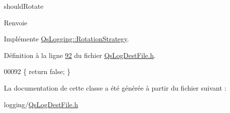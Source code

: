 should\-Rotate 

\begin{DoxyReturn}{Renvoie}

\end{DoxyReturn}


Implémente \hyperlink{classQsLogging_1_1RotationStrategy_a53136a1009e8a0b30956ea83c43c4973}{Qs\-Logging\-::\-Rotation\-Strategy}.



Définition à la ligne \hyperlink{QsLogDestFile_8h_source_l00092}{92} du fichier \hyperlink{QsLogDestFile_8h_source}{Qs\-Log\-Dest\-File.\-h}.


\begin{DoxyCode}
00092 \{ \textcolor{keywordflow}{return} \textcolor{keyword}{false}; \}
\end{DoxyCode}


La documentation de cette classe a été générée à partir du fichier suivant \-:\begin{DoxyCompactItemize}
\item 
logging/\hyperlink{QsLogDestFile_8h}{Qs\-Log\-Dest\-File.\-h}\end{DoxyCompactItemize}
